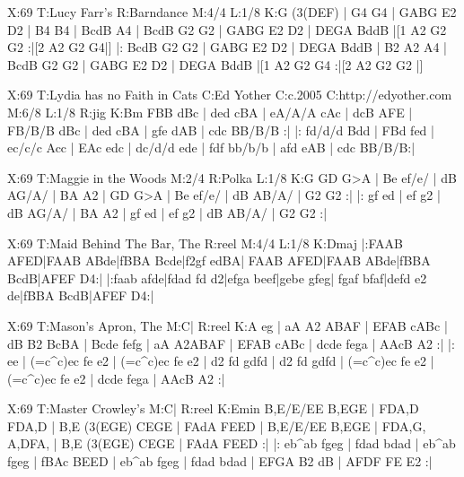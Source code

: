 \documentclass[letterpaper]{article}
\begin{document}
\begin{abc}[name]
X:69
T:Lucy Farr's
R:Barndance
M:4/4
L:1/8
K:G
(3(DEF) | G4 G4 | GABG E2 D2 | B4 B4 | BcdB A4 |
BcdB G2 G2 | GABG E2 D2 | DEGA BddB |[1 A2 G2 G2 :|[2 A2 G2 G4|]
|: BcdB G2 G2 | GABG E2 D2 | DEGA BddB | B2 A2 A4 |
BcdB G2 G2 | GABG E2 D2 | DEGA BddB |[1 A2 G2 G4 :|[2 A2 G2 G2 |]
\end{abc}

\begin{abc}[name]
X:69
T:Lydia has no Faith in Cats
C:Ed Yother
C:c.2005
C:http://edyother.com
M:6/8
L:1/8
R:jig
K:Bm
FBB dBc | ded cBA | eA/A/A cAc | dcB AFE |
FB/B/B dBc | ded cBA | gfe dAB | cdc BB/B/B :|
|: fd/d/d Bdd | FBd fed | ec/c/c Acc | EAc edc |
dc/d/d ede | fdf bb/b/b | afd eAB | cdc BB/B/B:|
\end{abc}

\begin{abc}[name]
X:69
T:Maggie in the Woods
M:2/4
R:Polka
L:1/8
K:G
GD G>A | Be ef/e/ | dB AG/A/ | BA A2 |
GD G>A | Be ef/e/ | dB AB/A/ | G2 G2 :|
|: gf ed | ef g2 | dB AG/A/ | BA A2 |
gf ed | ef g2 | dB AB/A/ | G2 G2 :|
\end{abc}

\begin{abc}[name]
X:69
T:Maid Behind The Bar, The
R:reel
M:4/4
L:1/8
K:Dmaj
|:FAAB AFED|FAAB ABde|fBBA Bcde|f2gf edBA|
FAAB AFED|FAAB ABde|fBBA BcdB|AFEF D4:|
|:faab afde|fdad fd d2|efga beef|gebe gfeg|
fgaf bfaf|defd e2 de|fBBA BcdB|AFEF D4:|
\end{abc}

\begin{abc}[name]
X:69
T:Mason's Apron, The
M:C|
R:reel
K:A
eg | aA A2 ABAF | EFAB cABc | dB B2 BcBA | Bcde fefg |
aA A2ABAF | EFAB cABc | dcde fega | AAcB A2 :|
|: ee | (=c^c)ec fe e2 | (=c^c)ec fe e2 | d2 fd gdfd | d2 fd gdfd |
(=c^c)ec fe e2 | (=c^c)ec fe e2 | dcde fega | AAcB A2 :|
\end{abc}

\begin{abc}[name]
X:69
T:Master Crowley's
M:C|
R:reel
K:Emin
B,E/E/EE B,EGE | FDA,D FDA,D | B,E (3(EGE) CEGE | FAdA FEED |
B,E/E/EE B,EGE | FDA,G, A,DFA, | B,E (3(EGE) CEGE | FAdA FEED :|
|: eb^ab fgeg | fdad bdad | eb^ab fgeg | fBAc BEED |
eb^ab fgeg | fdad bdad | EFGA B2 dB | AFDF FE E2 :|
\end{abc}
\end{document}
